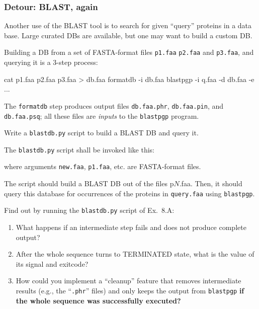 \documentclass[english,serif,mathserif,xcolor=pdftex,dvipsnames,table]{beamer}
\begin{document}
\begin{frame}[fragile]
  \frametitle{Detour: BLAST, again}

  Another use of the BLAST tool is to search for given ``query''
  proteins in a data base.  Large curated DBs are available, but one
  may want to build a custom DB.

  \+
  Building a DB from a set of FASTA-format files \texttt{p1.faa}
  \texttt{p2.faa} and \texttt{p3.faa}, and querying it is a 3-step
  process:
\begin{sh}
  cat p1.faa p2.faa p3.faa > db.faa
  formatdb -i db.faa
  blastpgp -i q.faa -d db.faa -e ...
\end{sh}

  \+ The \texttt{formatdb} step produces output files
  \texttt{db.faa.phr}, \texttt{db.faa.pin}, and \texttt{db.faa.psq}; all
  these files are \emph{inputs} to the \texttt{blastpgp} program.
\end{frame}


\begin{frame}[fragile]
  \begin{exercise*}[8.A]
    Write a \texttt{blastdb.py} script to build a BLAST DB and query it.

    \+
    The \texttt{blastdb.py} script shall be invoked like this:
    where arguments \texttt{new.faa}, \texttt{p1.faa}, etc. are FASTA-format files.

    \+
    The script should build a BLAST DB out of the files {p$N$.faa}.
    Then, it should query this database for occurrences of the
    proteins in \texttt{query.faa} using \texttt{blastpgp}.
  \end{exercise*}
\end{frame}

\begin{frame}
  \begin{exercise*}[8.B]
    Find out by running the \texttt{blastdb.py} script of Ex.~8.A:

    \+
    \begin{enumerate}
    \item What happens if an intermediate step fails and does not
      produce complete output?

      \+
    \item After the whole sequence turns to TERMINATED state, what is
      the value of its signal and exitcode?

      \+
    \item How could you implement a ``cleanup'' feature that removes
      intermediate results (e.g., the ``\texttt{.phr}'' files) and
      only keeps the output from \texttt{blastpgp} \textbf{if the
        whole sequence was successfully executed?}
    \end{enumerate}
  \end{exercise*}
\end{frame}
\end{document}
